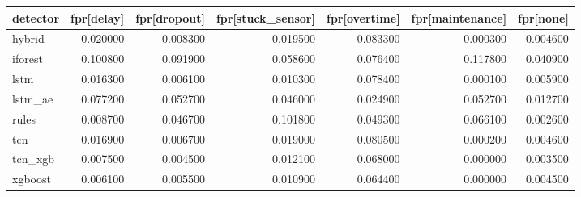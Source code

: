\begin{tabular}{lrrrrrr}
\toprule
detector & fpr[delay] & fpr[dropout] & fpr[stuck\_sensor] & fpr[overtime] & fpr[maintenance] & fpr[none] \\
\midrule
hybrid & 0.020000 & 0.008300 & 0.019500 & 0.083300 & 0.000300 & 0.004600 \\
iforest & 0.100800 & 0.091900 & 0.058600 & 0.076400 & 0.117800 & 0.040900 \\
lstm & 0.016300 & 0.006100 & 0.010300 & 0.078400 & 0.000100 & 0.005900 \\
lstm\_ae & 0.077200 & 0.052700 & 0.046000 & 0.024900 & 0.052700 & 0.012700 \\
rules & 0.008700 & 0.046700 & 0.101800 & 0.049300 & 0.066100 & 0.002600 \\
tcn & 0.016900 & 0.006700 & 0.019000 & 0.080500 & 0.000200 & 0.004600 \\
tcn\_xgb & 0.007500 & 0.004500 & 0.012100 & 0.068000 & 0.000000 & 0.003500 \\
xgboost & 0.006100 & 0.005500 & 0.010900 & 0.064400 & 0.000000 & 0.004500 \\
\bottomrule
\end{tabular}

